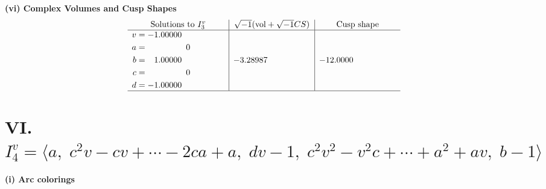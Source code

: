 \documentclass[1p]{elsarticle_modified}
\theoremstyle{definition}
\newcommand{\I}{\sqrt{-1}}
\begin{document}
\newpage\flushleft \textbf{(vi) Complex Volumes and Cusp Shapes}
$$\begin{array}{c|c|c}  
\text{Solutions to }I^v_{3}& \I (\text{vol} + \sqrt{-1}CS) & \text{Cusp shape}\\
 \hline 
\begin{aligned}
v &= -1.00000\phantom{ +0.000000I} \\
a &= \phantom{-0.000000 } 0 \\
b &= \phantom{-}1.00000\phantom{ +0.000000I} \\
c &= \phantom{-0.000000 } 0 \\
d &= -1.00000\phantom{ +0.000000I}\end{aligned}
 & -3.28987\phantom{ +0.000000I} & -12.0000\phantom{ +0.000000I}\\
 \hline 
 \end{array}$$\newpage\newpage\renewcommand{\arraystretch}{1}
\centering \section*{VI. $I^v_{4}= \langle a,\;c^2 v- c v+\cdots-2 c a+a,\;d v-1,\;c^2 v^2- v^2 c+\cdots+a^2+a v,\;b-1 \rangle$}
\flushleft \textbf{(i) Arc colorings}\\
\end{document}
